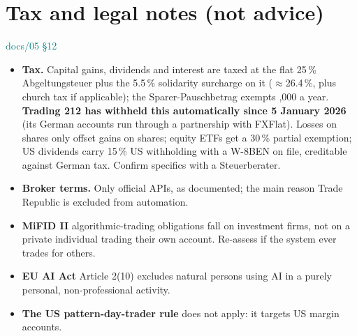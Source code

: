 \documentclass[11pt,a4paper]{article}
\newcommand\euro{\ifmmode\text{\texteuro}\else\texteuro\fi}
\newcommand\Section[1]{\Needspace{14\baselineskip}\section{#1}}
\newcommand\doc[1]{\textsf{\footnotesize\textcolor{teal}{#1}}}
\begin{document}
\appendix
\Section{Tax and legal notes (not advice)}\label{app:tax}
\doc{docs/05 §12}
\begin{itemize}
  \item \textbf{Tax.} Capital gains, dividends and interest are taxed at the flat 25\,\% Abgeltungsteuer plus the 5.5\,\%
        solidarity surcharge on it ($\approx$26.4\,\%, plus church tax if applicable); the Sparer-Pauschbetrag exempts \euro1,000
        a year. \textbf{Trading 212 has withheld this automatically since 5 January 2026} (its German accounts run through a
        partnership with FXFlat). Losses on shares only offset gains on shares; equity ETFs get a 30\,\% partial exemption; US
        dividends carry 15\,\% US withholding with a W-8BEN on file, creditable against German tax. Confirm specifics with a
        Steuerberater.
  \item \textbf{Broker terms.} Only official APIs, as documented; the main reason Trade Republic is excluded from automation.
  \item \textbf{MiFID II} algorithmic-trading obligations fall on investment firms, not on a private individual trading their
        own account. Re-assess if the system ever trades for others.
  \item \textbf{EU AI Act} Article 2(10) excludes natural persons using AI in a purely personal, non-professional activity.
  \item \textbf{The US pattern-day-trader rule} does not apply: it targets US margin accounts.
\end{itemize}
\end{document}
